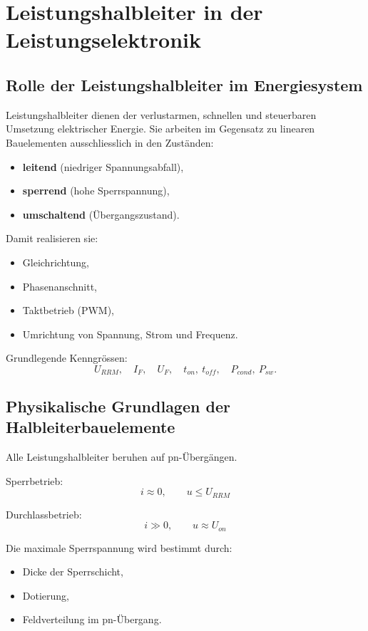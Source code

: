 \section{Leistungshalbleiter in der Leistungselektronik}

\subsection{Rolle der Leistungshalbleiter im Energiesystem}

Leistungshalbleiter dienen der verlustarmen, schnellen und steuerbaren Umsetzung elektrischer Energie.
Sie arbeiten im Gegensatz zu linearen Bauelementen ausschliesslich in den Zuständen:
\begin{itemize}
\item \textbf{leitend} (niedriger Spannungsabfall),
\item \textbf{sperrend} (hohe Sperrspannung),
\item \textbf{umschaltend} (Übergangszustand).
\end{itemize}

Damit realisieren sie:
\begin{itemize}
\item Gleichrichtung,
\item Phasenanschnitt,
\item Taktbetrieb (PWM),
\item Umrichtung von Spannung, Strom und Frequenz.
\end{itemize}

Grundlegende Kenngrössen:
\[
U_{RRM},\quad I_{F},\quad U_F,\quad t_{on},\ t_{off},\quad P_{cond},\ P_{sw}.
\]

\subsection{Physikalische Grundlagen der Halbleiterbauelemente}

Alle Leistungshalbleiter beruhen auf pn-Übergängen.

Sperrbetrieb:
\[
i \approx 0,\qquad u \le U_{RRM}
\]

Durchlassbetrieb:
\[
i \gg 0,\qquad u \approx U_{on}
\]

Die maximale Sperrspannung wird bestimmt durch:
\begin{itemize}
\item Dicke der Sperrschicht,
\item Dotierung,
\item Feldverteilung im pn-Übergang.
\end{itemize}

